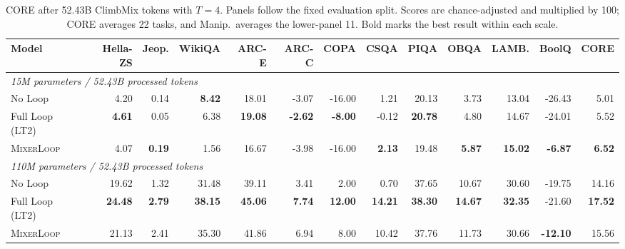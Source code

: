 \documentclass[letterpaper]{article} %
\newcommand{\method}{\textsc{MixerLoop}}
\begin{document}
\begin{table}[t]
\centering
\footnotesize
\setlength{\tabcolsep}{2.3pt}
\caption{CORE after 52.43B ClimbMix tokens with $T=4$. Panels follow the fixed
evaluation split. Scores are chance-adjusted and multiplied by 100; CORE
averages 22 tasks, and Manip.\ averages the lower-panel 11. Bold marks the best
result within each scale.}
\label{tab:core_main}
\begin{tabular}{lrrrrrrrrrrrr}
\toprule
Model
& Hella-ZS & Jeop. & WikiQA & ARC-E & ARC-C
& COPA & CSQA & PIQA & OBQA & LAMB. & BoolQ & CORE \\
\midrule
\multicolumn{13}{l}{\textit{15M parameters / 52.43B processed tokens}} \\
No Loop
& 4.20 & 0.14 & \textbf{8.42} & 18.01 & -3.07
& -16.00 & 1.21 & 20.13 & 3.73 & 13.04 & -26.43 & 5.01 \\
Full Loop (LT2)
& \textbf{4.61} & 0.05 & 6.38 & \textbf{19.08} & \textbf{-2.62}
& \textbf{-8.00} & -0.12 & \textbf{20.78} & 4.80 & 14.67 & -24.01 & 5.52 \\
\method{}
& 4.07 & \textbf{0.19} & 1.56 & 16.67 & -3.98
& -16.00 & \textbf{2.13} & 19.48 & \textbf{5.87} & \textbf{15.02} & \textbf{-6.87} & \textbf{6.52} \\
\midrule
\multicolumn{13}{l}{\textit{110M parameters / 52.43B processed tokens}} \\
No Loop
& 19.62 & 1.32 & 31.48 & 39.11 & 3.41
& 2.00 & 0.70 & 37.65 & 10.67 & 30.60 & -19.75 & 14.16 \\
Full Loop (LT2)
& \textbf{24.48} & \textbf{2.79} & \textbf{38.15} & \textbf{45.06} & \textbf{7.74}
& \textbf{12.00} & \textbf{14.21} & \textbf{38.30} & \textbf{14.67} & \textbf{32.35} & -21.60 & \textbf{17.52} \\
\method{}
& 21.13 & 2.41 & 35.30 & 41.86 & 6.94
& 8.00 & 10.42 & 37.76 & 11.73 & 30.66 & \textbf{-12.10} & 15.56 \\
\bottomrule
\end{tabular}

\vspace{4pt}


\end{table}
\end{document}
